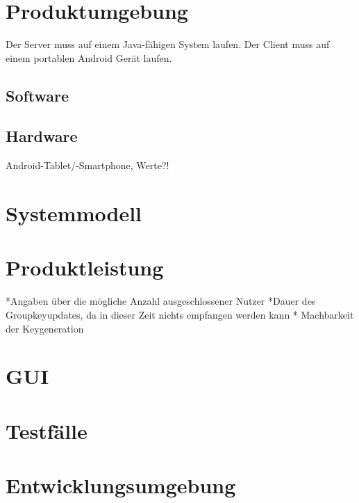 \documentclass[a4paper,10pt]{article}
\begin{document}
\section{Produktumgebung}
Der Server muss auf einem Java-fähigen System laufen.
Der Client muss auf einem portablen Android Gerät laufen.
\subsection{Software}

\subsection{Hardware}
Android-Tablet/-Smartphone, Werte?!
\section{Systemmodell}

\section{Produktleistung}
*Angaben über die mögliche Anzahl ausgeschlossener Nutzer
*Dauer des Groupkeyupdates, da in dieser Zeit nichts empfangen werden kann
* Machbarkeit der Keygeneration


\section{GUI}

\section{Testfälle}

\section{Entwicklungsumgebung}

\clearpage

\end{document}
